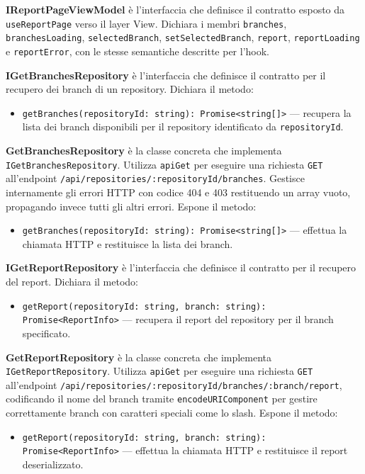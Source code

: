 \documentclass[a4paper, 11pt]{article}
\newcounter{subsubsubsection}[subsubsection]
\newcounter{subsubsubsubsection}[subsubsubsection]
\begin{document}
\textbf{IReportPageViewModel} è l'interfaccia che definisce il contratto esposto da
\texttt{useReportPage} verso il layer View. Dichiara i membri \texttt{branches},
\texttt{branchesLoading}, \texttt{selectedBranch}, \texttt{setSelectedBranch}, \texttt{report},
\texttt{reportLoading} e \texttt{reportError}, con le stesse semantiche descritte per l'hook.


\textbf{IGetBranchesRepository} è l'interfaccia che definisce il contratto per il recupero
dei branch di un repository. Dichiara il metodo:
\begin{itemize}
  \item \texttt{getBranches(repositoryId: string): Promise<string[]>} — recupera la lista dei
        branch disponibili per il repository identificato da \texttt{repositoryId}.
\end{itemize}

\textbf{GetBranchesRepository} è la classe concreta che implementa
\texttt{IGetBranchesRepository}. Utilizza \texttt{apiGet} per eseguire una richiesta
\texttt{GET} all'endpoint \texttt{/api/repositories/:repositoryId/branches}. Gestisce
internamente gli errori HTTP con codice 404 e 403 restituendo un array vuoto, propagando
invece tutti gli altri errori. Espone il metodo:
\begin{itemize}
  \item \texttt{getBranches(repositoryId: string): Promise<string[]>} — effettua la chiamata
        HTTP e restituisce la lista dei branch.
\end{itemize}

\textbf{IGetReportRepository} è l'interfaccia che definisce il contratto per il recupero del
report. Dichiara il metodo:
\begin{itemize}
  \item \texttt{getReport(repositoryId: string, branch: string): Promise<ReportInfo>} —
        recupera il report del repository per il branch specificato.
\end{itemize}

\textbf{GetReportRepository} è la classe concreta che implementa \texttt{IGetReportRepository}.
Utilizza \texttt{apiGet} per eseguire una richiesta \texttt{GET} all'endpoint
\texttt{/api/repositories/:repositoryId/branches/:branch/report}, codificando il nome del
branch tramite \texttt{encodeURIComponent} per gestire correttamente branch con caratteri
speciali come lo slash. Espone il metodo:
\begin{itemize}
  \item \texttt{getReport(repositoryId: string, branch: string): Promise<ReportInfo>} —
        effettua la chiamata HTTP e restituisce il report deserializzato.
\end{itemize}
\end{document}
